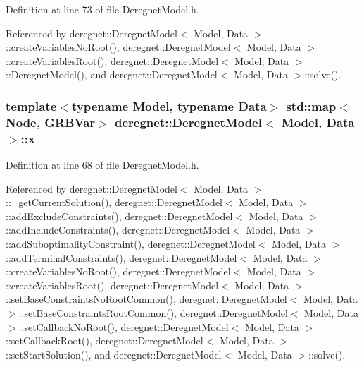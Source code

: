 Definition at line 73 of file Deregnet\+Model.\+h.



Referenced by deregnet\+::\+Deregnet\+Model$<$ Model, Data $>$\+::create\+Variables\+No\+Root(), deregnet\+::\+Deregnet\+Model$<$ Model, Data $>$\+::create\+Variables\+Root(), deregnet\+::\+Deregnet\+Model$<$ Model, Data $>$\+::\+Deregnet\+Model(), and deregnet\+::\+Deregnet\+Model$<$ Model, Data $>$\+::solve().

\subsubsection[{\texorpdfstring{x}{x}}]{\setlength{\rightskip}{0pt plus 5cm}template$<$typename Model, typename Data$>$ std\+::map$<${\bf Node}, G\+R\+B\+Var$>$ {\bf deregnet\+::\+Deregnet\+Model}$<$ Model, {\bf Data} $>$\+::x\hspace{0.3cm}{\ttfamily [protected]}}\hypertarget{classderegnet_1_1DeregnetModel_a360c980f3fec4dfbab50e9bb06a933a8}{}\label{classderegnet_1_1DeregnetModel_a360c980f3fec4dfbab50e9bb06a933a8}


Definition at line 68 of file Deregnet\+Model.\+h.



Referenced by deregnet\+::\+Deregnet\+Model$<$ Model, Data $>$\+::\+\_\+get\+Current\+Solution(), deregnet\+::\+Deregnet\+Model$<$ Model, Data $>$\+::add\+Exclude\+Constraints(), deregnet\+::\+Deregnet\+Model$<$ Model, Data $>$\+::add\+Include\+Constraints(), deregnet\+::\+Deregnet\+Model$<$ Model, Data $>$\+::add\+Suboptimality\+Constraint(), deregnet\+::\+Deregnet\+Model$<$ Model, Data $>$\+::add\+Terminal\+Constraints(), deregnet\+::\+Deregnet\+Model$<$ Model, Data $>$\+::create\+Variables\+No\+Root(), deregnet\+::\+Deregnet\+Model$<$ Model, Data $>$\+::create\+Variables\+Root(), deregnet\+::\+Deregnet\+Model$<$ Model, Data $>$\+::set\+Base\+Constraints\+No\+Root\+Common(), deregnet\+::\+Deregnet\+Model$<$ Model, Data $>$\+::set\+Base\+Constraints\+Root\+Common(), deregnet\+::\+Deregnet\+Model$<$ Model, Data $>$\+::set\+Callback\+No\+Root(), deregnet\+::\+Deregnet\+Model$<$ Model, Data $>$\+::set\+Callback\+Root(), deregnet\+::\+Deregnet\+Model$<$ Model, Data $>$\+::set\+Start\+Solution(), and deregnet\+::\+Deregnet\+Model$<$ Model, Data $>$\+::solve().


